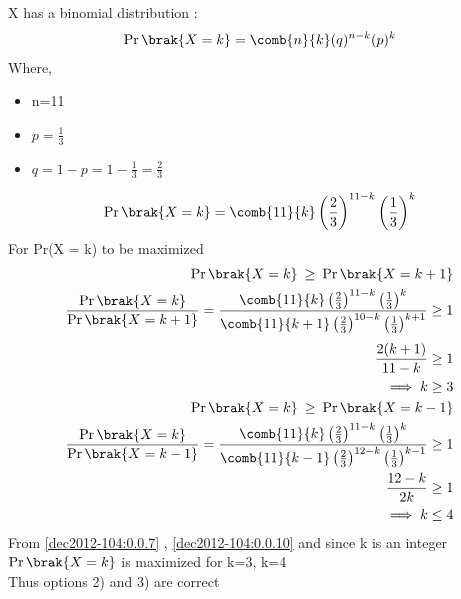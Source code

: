 X has a binomial distribution :
\begin{align}
\Pr\brak{X=k} = {\comb{n}{k}}(q)^{n-k}(p)^{k}
\end{align}
Where,
\begin{itemize}
\item n=11
\item $\displaystyle{p=\frac{1}{3}}$
\item $\displaystyle{q=1-p=1-\frac{1}{3}=\frac{2}{3}}$
\end{itemize}
\begin{align}
\Pr\brak{X = k}={\comb{11}{k}}\left(\frac{2}{3}\right)^{11-k}\left(\frac{1}{3}\right)^{k}
\end{align}
For Pr(X = k) to be maximized
\begin{align}
\Pr\brak{X = k}\:\geq\:\Pr\brak{X = k+1}\\
\frac{\Pr\brak{X = k}}{\Pr\brak{X = k+1}}=\frac{{\comb{11}{k}}\left(\frac{2}{3}\right)^{11-k}\left(\frac{1}{3}\right)^{k}}{{\comb{11}{k+1}}\left(\frac{2}{3}\right)^{10-k}\left(\frac{1}{3}\right)^{k+1}}\geq1
\end{align}
\begin{align}
\frac{2(k+1)}{11-k}\geq1\\
\implies k\geq3\label{dec2012-104:0.0.7}\\
\Pr\brak{X = k}\:\geq\:\Pr\brak{X = k-1}\\
\frac{\Pr\brak{X = k}}{\Pr\brak{X = k-1}}=\frac{{\comb{11}{k}}\left(\frac{2}{3}\right)^{11-k}\left(\frac{1}{3}\right)^{k}}{{\comb{11}{k-1}}\left(\frac{2}{3}\right)^{12-k}\left(\frac{1}{3}\right)^{k-1}}\geq1\\
\frac{12-k}{2k}\geq1\\
\implies k\leq4\label{dec2012-104:0.0.10}
\end{align}
From \eqref{dec2012-104:0.0.7} , \eqref{dec2012-104:0.0.10} and since k is an integer\\
$\Pr\brak{X = k}$ is maximized for k=3, k=4\\
Thus options 2) and 3) are correct\\